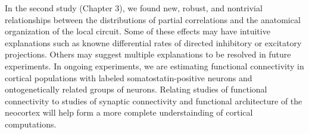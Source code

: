 In the second study (Chapter 3), we found new, robust, and nontrivial relationships between the distributions of partial correlations and the anatomical organization of the local circuit. Some of these effects may have intuitive explanations such as knowne  differential  rates of directed inhibitory or excitatory projections.  Others may suggest multiple explanations to be resolved in future experiments. In ongoing experiments, we are estimating functional connectivity in cortical populations with labeled somatostatin-positive neurons and ontogenetically related groups of neurons. Relating studies of functional connectivity to studies of synaptic connectivity and functional architecture of the neocortex will help form a more complete understainding of cortical computations.
